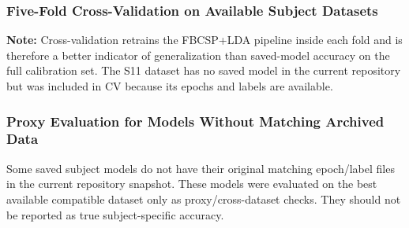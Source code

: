 \subsubsection{Five-Fold Cross-Validation on Available Subject Datasets}

\begin{table}[H]
    \centering
    \caption{Five-Fold Cross-Validation Accuracy on Available Subject Epoch Files}
    \label{tab:cv_accuracy}
\end{table}

\textbf{Note:} Cross-validation retrains the FBCSP+LDA pipeline inside each fold and is therefore a better indicator of generalization than saved-model accuracy on the full calibration set. The S11 dataset has no saved model in the current repository but was included in CV because its epochs and labels are available.

\subsubsection{Proxy Evaluation for Models Without Matching Archived Data}

Some saved subject models do not have their original matching epoch/label files in the current repository snapshot. These models were evaluated on the best available compatible dataset only as proxy/cross-dataset checks. They should not be reported as true subject-specific accuracy.

